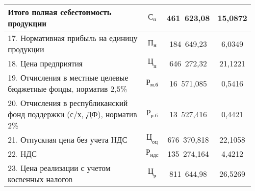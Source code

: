 {\begin{longtable}{| m{10.5cm} | c | c | c |}
      \textbf{Итого \newline полная себестоимость продукции}
      & \( \mathbf{\text{С}_{\text{п}}} \) & \textbf{461~623,08} & \textbf{15,0872} \\
      \hline

      17. Нормативная прибыль на единицу продукции
      & \( \text{П}_{\text{н}} \) & 184~649,23 & 6,0349 \\
      \hline

      18. Цена предприятия
      & \( \mathbf{\text{Ц}_{\text{п}}} \) & 646~272,32 & 21,1221 \\
      \hline

      19. Отчисления в местные целевые бюджетные фонды, \newline
      норматив 2{,}5\%
      & \( \text{Р}_{\text{м.б}} \) & 16~571,085 & 0,5416 \\
      \hline

      20. Отчисления в республиканский фонд поддержки \newline
      (с/х, ДФ), норматив 2\%
      & \( \text{Р}_{\text{р.б}} \) & 13~527,416 & 0,4421 \\
      \hline

      21. Отпускная цена без учета НДС
      & \( \text{Ц}_{\text{оц}} \) & 676~370,818 & 22,1058 \\
      \hline

      22. НДС
      & \( \text{Р}_{\text{ндс}} \) & 135~274,164 & 4,4212 \\
      \hline

      23. Цена реализации с учетом косвенных налогов
      & \( \text{Ц}_{\text{р}} \) & 811~644,98 & 26,5269 \\
      \hline
\end{longtable}
}
